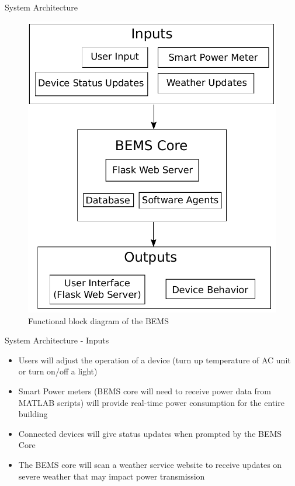 \documentclass{beamer}
\begin{document}
\begin{frame}{System Architecture}{}
    \begin{figure}
        \centering
        \includegraphics[scale=0.4]{figs/functionalBlockDiagram.pdf}
        \caption{Functional block diagram of the BEMS}
        \label{fig:my_label}
    \end{figure}
\end{frame}

\begin{frame}{System Architecture - Inputs}{} %
    \begin{itemize}
        \item Users will adjust the operation of a device (turn up temperature of AC unit or turn on/off a light)
        \item Smart Power meters (BEMS core will need to receive power data from MATLAB scripts) will provide real-time power consumption for the entire building
        \item Connected devices will give status updates when prompted by the BEMS Core
        \item The BEMS core will scan a weather service website to receive updates on severe weather that may impact power transmission
    \end{itemize}
\end{frame}
\end{document}
